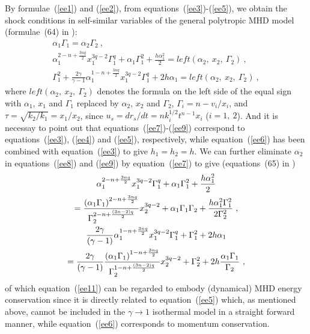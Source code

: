 \documentclass[fleqn,usenatbib]{mnras}
\begin{document}
By formulae~(\ref{ee1}) and (\ref{ee2}), from equations~(\ref{ee3})-(\ref{ee5}), we obtain the shock conditions in self-similar variables of the general polytropic MHD model (formulae~(64) in \citet{wang2008dynamic}):
\begin{gather}
\alpha_{1}\Gamma_{1}=\alpha_{2}\Gamma_{2}\ ,\label{ee7}\\
\alpha_{1}^{2-n+\frac{3nq}{2}}x_{1}^{3q-2}\Gamma_{1}^{q}+\alpha_{1}\Gamma_{1}^{2}+\frac{h\alpha_{1}^{2}}{2}=left(\alpha_{2},\ x_{2},\ \Gamma_{2})\ ,\label{ee8}\\
\Gamma_{1}^{2}+\frac{2\gamma}{\gamma-1}\alpha_{1}^{1-n+\frac{3nq}{2}}x_{1}^{3q-2}\Gamma_{1}^{q}+2h\alpha_{1}=left(\alpha_{2},\ x_{2},\ \Gamma_{2})\ ,\label{ee9}
\end{gather}
where $left(\alpha_{2},\ x_{2},\ \Gamma_{2})$ denotes the formula on the left side of the equal sign with $\alpha_{1}$, $x_{1}$ and $\Gamma_{1}$ replaced by $\alpha_{2}$, $x_{2}$ and $\Gamma_{2}$, $\Gamma_{i}=n-v_{i}/x_{i}$, and $\tau=\sqrt{k_{2}/k_{1}}=x_{1}/x_{2}$, since $u_{s}=dr_{s}/dt=nk_{i}^{1/2}t^{n-1}x_{i}$ ($i=1,\ 2$). And it is necessay to point out that equations~(\ref{ee7})-(\ref{ee9}) correspond to equations~(\ref{ee3}), (\ref{ee4}) and (\ref{ee5}), respectively, while equation~(\ref{ee6}) has been combined with equation~(\ref{ee3}) to give $h_{1}=h_{2}=h$. We can further eliminate $\alpha_{2}$ in equations~(\ref{ee8}) and (\ref{ee9}) by equation~(\ref{ee7}) to give (equations~(65) in \citet{wang2008dynamic})
\begin{gather}
\alpha_{1}^{2-n+\frac{3nq}{2}}x_{1}^{3q-2}\Gamma_{1}^{q}+\alpha_{1}\Gamma_{1}^{2}+\frac{h\alpha_{1}^{2}}{2}\notag\\
=\frac{\left(\alpha_{1}\Gamma_{1}\right)^{2-n+\frac{3nq}{2}}}{\Gamma_{2}^{2-n+\frac{(3n-2)q}{2}}}x_{2}^{3q-2}+\alpha_{1}\Gamma_{1}\Gamma_{2}+\frac{h\alpha_{1}^{2}\Gamma_{1}^{2}}{2\Gamma_{2}^{2}}\ ,\label{ee10}\\
\frac{2\gamma}{(\gamma-1)}\alpha_{1}^{1-n+\frac{3nq}{2}}x_{1}^{3q-2}\Gamma_{1}^{q}+\Gamma_{1}^{2}+2h\alpha_{1}\notag\\
=\frac{2\gamma}{(\gamma-1)}\frac{\left(\alpha_{1}\Gamma_{1}\right)^{1-n+\frac{3nq}{2}}}{\Gamma_{2}^{1-n+\frac{(3n-2)q}{2}}}x_{2}^{3q-2}+\Gamma_{2}^{2}+2h\frac{\alpha_{1}\Gamma_{1}}{\Gamma_{2}}\ ,\label{ee11}
\end{gather}
of which equation~(\ref{ee11}) can be regarded to embody (dynamical) MHD energy conservation since it is directly related to equation~(\ref{ee5}) which, as mentioned above, cannot be included in the $\gamma\rightarrow 1$ isothermal model in a straight forward manner, while equation~(\ref{ee6}) corresponds to momentum conservation.
\end{document}
